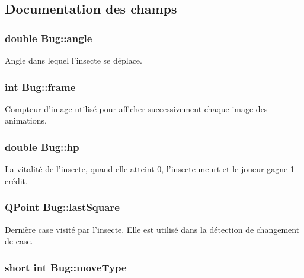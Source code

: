 \subsection{Documentation des champs}
\hypertarget{classBug_a096a8babe1be6df06b5dea87dc3eb1fe}{
\subsubsection[{angle}]{\setlength{\rightskip}{0pt plus 5cm}double {\bf Bug::angle}}}
\label{classBug_a096a8babe1be6df06b5dea87dc3eb1fe}
Angle dans lequel l'insecte se déplace. \hypertarget{classBug_ad7e3597cf049f1051be94fcaf2fd3598}{
\subsubsection[{frame}]{\setlength{\rightskip}{0pt plus 5cm}int {\bf Bug::frame}}}
\label{classBug_ad7e3597cf049f1051be94fcaf2fd3598}
Compteur d'image utilisé pour afficher successivement chaque image des animations. \hypertarget{classBug_a3ebb13469010dbcd7bd7875455e022c3}{
\subsubsection[{hp}]{\setlength{\rightskip}{0pt plus 5cm}double {\bf Bug::hp}}}
\label{classBug_a3ebb13469010dbcd7bd7875455e022c3}
La vitalité de l'insecte, quand elle atteint 0, l'insecte meurt et le joueur gagne 1 crédit. \hypertarget{classBug_aead6b14a5cfd6713e8913f3e84cd6797}{
\subsubsection[{lastSquare}]{\setlength{\rightskip}{0pt plus 5cm}QPoint {\bf Bug::lastSquare}}}
\label{classBug_aead6b14a5cfd6713e8913f3e84cd6797}
Dernière case visité par l'insecte. Elle est utilisé dans la détection de changement de case. \hypertarget{classBug_a00484a34d1e537e92b0bba7e2e5ddbeb}{
\subsubsection[{moveType}]{\setlength{\rightskip}{0pt plus 5cm}short int {\bf Bug::moveType}}}
